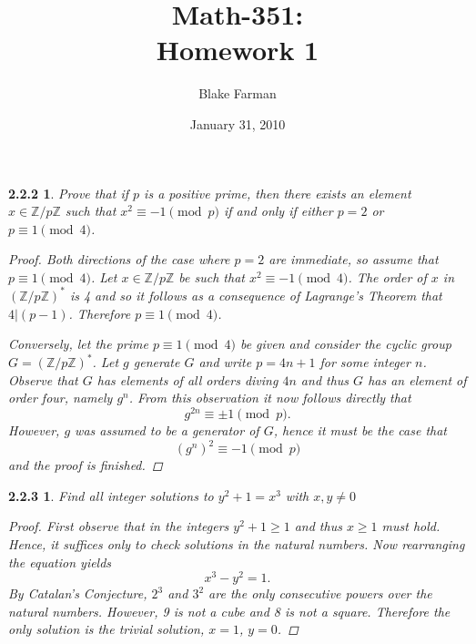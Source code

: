 \documentclass[10pt]{amsart}
\author{Blake Farman}
\title{Math-351:\\Homework 1}
\date{January 31, 2010}\pdfpagewidth 8.5in
\begin{document}
\maketitle

\renewcommand{\qedsymbol}{\(\blacksquare\)}
\newcommand{\znz}[1]{\mathbb{Z} / #1\mathbb{Z}}
\newcommand{\mznz}[1]{(\mathbb{Z} / #1\mathbb{Z})^*}

\newtheorem*{1}{2.2.2}
\begin{1}
  Prove that if \(p\) is a positive prime, then there exists an element \(x \in  \znz{p}\) such that \(x^2 \equiv -1 \pmod{p}\) if and only if either \(p = 2\) or \(p \equiv 1 \pmod{4}\).
  \begin{proof}
    Both directions of the case where \(p = 2\) are immediate, so assume that \(p \equiv 1 \pmod{4}\).  
    Let \(x \in \znz{p}\) be such that \(x^2 \equiv -1 \pmod{4}\).
    The order of \(x\) in \(\mznz{p}\) is 4 and so it follows as a consequence of Lagrange's Theorem that \(4 | (p-1)\).
    Therefore \(p \equiv 1 \pmod{4}\).

    Conversely, let the prime \(p \equiv 1 \pmod{4}\) be given and consider the cyclic group \(G = \mznz{p}\).
    Let \(g\) generate \(G\) and write \(p = 4n + 1\) for some integer \(n\).
    Observe that \(G\) has elements of all orders diving \(4n\) and thus \(G\) has an element of order four, namely \(g^n\).
    From this observation it now follows directly that \[g^{2n} \equiv \pm 1 \pmod{p}.\]
    However, \(g\) was assumed to be a generator of \(G\), hence it must be the case that \[(g^n)^2 \equiv -1 \pmod{p}\] and the proof is finished.
  \end{proof}
\end{1}

\newtheorem*{2}{2.2.3}
\begin{2}
  Find all integer solutions to \(y^2 + 1 = x^3\) with \(x,y \not = 0\)
  \begin{proof}
    First observe that in the integers \(y^2 + 1 \geq 1\) and thus \(x \geq 1\) must hold.
    Hence, it suffices only to check solutions in the natural numbers.
    Now rearranging the equation yields \[x^3 - y^2 = 1.\]
    By Catalan's Conjecture, \(2^3\) and \(3^2\) are the only consecutive powers over the natural numbers.
    However, 9 is not a cube and 8 is not a square.
    Therefore the only solution is the trivial solution, \(x = 1\), \(y = 0\).
  \end{proof}
\end{2}

\newpage
\end{document}

